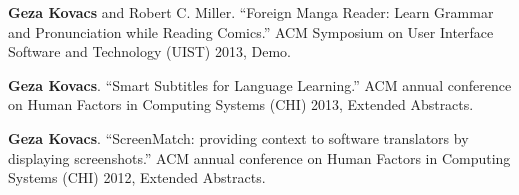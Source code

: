 \documentclass[margin,line]{resume}
\begin{document}
\begin{resume}
\textbf{Geza Kovacs} and Robert C. Miller. ``Foreign Manga Reader: Learn Grammar and Pronunciation while Reading Comics.'' ACM Symposium on User Interface Software and Technology (UIST) 2013, Demo.

\textbf{Geza Kovacs}. ``Smart Subtitles for Language Learning.'' ACM annual conference on Human Factors in Computing Systems (CHI) 2013, Extended Abstracts.%

\textbf{Geza Kovacs}. ``ScreenMatch: providing context to software translators by displaying screenshots.'' ACM annual conference on Human Factors in Computing Systems (CHI) 2012, Extended Abstracts.%


\end{resume}
\end{document}
